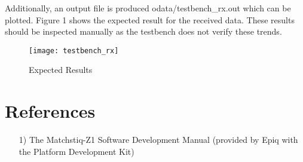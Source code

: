 \documentclass{article}
\begin{document}
\begin{flushleft}
Additionally, an output file is produced odata/testbench\_rx.out which can be plotted. Figure 1 shows the expected result for the received data. These results should be inspected manually as the testbench does not verify these trends.\par\bigskip
	\begin{figure}[ht]
		\centerline{\texttt{[image: testbench\_rx]}}
		\caption{Expected Results}
		\label{fig:tb}
	\end{figure}
\end{flushleft}

\section*{References}
\begin{flushleft}
	\begin{itemize}
		\item[1)] The Matchstiq-Z1 Software Development Manual (provided by Epiq with the Platform Development Kit)
	\end{itemize}
\end{flushleft}
\end{document}
